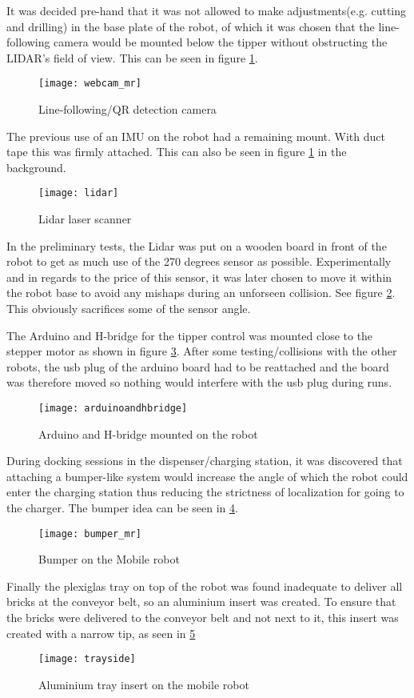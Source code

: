 It was decided pre-hand that it was not allowed to make adjustments(e.g. 
cutting and drilling) in the base plate of the robot, of which it was chosen 
that the line-following camera would be mounted below the tipper without 
obstructing the LIDAR's field of view. This can be seen in figure 
\ref{fig:webcam_mr}.
\begin{figure}[H]
	\centering
	\texttt{[image: webcam\_mr]}
	\caption{Line-following/QR detection camera}
	\label{fig:webcam_mr}
	\end{figure}
The previous use of an IMU on the robot had a remaining mount. With duct tape 
this was firmly attached. This can also be seen in figure \ref{fig:webcam_mr} 
in the background.
\begin{figure}[H]
	\centering
	\texttt{[image: lidar]}
	\caption{Lidar laser scanner}
	\label{fig:lidar}
\end{figure}

In the preliminary tests, the Lidar was put on a wooden board in front of the 
robot to get as much use of the 270 degrees sensor as possible. 
Experimentally and in regards to the price of this sensor, it was later chosen 
to move it within the robot base to avoid any mishaps during an unforseen 
collision. See figure \ref{fig:lidar}. This obviously sacrifices some of the 
sensor angle.


The Arduino and H-bridge for the tipper control was mounted close to the 
stepper motor as shown in figure \ref{fig:arduino}. After some 
testing/collisions with the other robots, the usb plug of the arduino board had 
to be reattached and the board was therefore moved so nothing would interfere 
with the usb plug during runs. 

\begin{figure}[H]
	\centering
	\texttt{[image: arduinoandhbridge]}
	\caption{Arduino and H-bridge mounted on the robot}
	\label{fig:arduino}
\end{figure}

During docking sessions in the dispenser/charging station, it was discovered 
that attaching a bumper-like system would increase the angle of which the robot 
could enter the charging station thus reducing the strictness of localization 
for going to the charger. The bumper idea can be seen in 
\ref{fig:bumper}.  


\begin{figure}[H]
	\centering
	\texttt{[image: bumper\_mr]}
	\caption{Bumper on the Mobile robot}
	\label{fig:bumper}
\end{figure}
Finally the plexiglas tray on top of the robot was found inadequate to deliver 
all bricks at the conveyor belt, so an aluminium insert was created. To ensure 
that the bricks were delivered to the conveyor belt and not next to it, this 
insert was created with a narrow tip, as seen in \ref{fig:tray}

\begin{figure}[H]
	\centering
	\texttt{[image: trayside]}
	\caption{Aluminium tray insert on the mobile robot}
	\label{fig:tray}
\end{figure}

